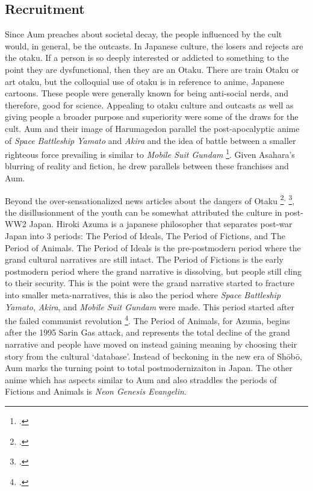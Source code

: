 \documentclass[12pt, letterpaper]{article}
\newcommand{\sorta}[1]{`#1'}
\newcommand{\poses}[1]{#1's}
\begin{document}
\subsection{Recruitment}
Since Aum preaches about societal decay, the people influenced by the cult would, in general, be the 
outcasts. In Japanese culture, the losers and rejects are the otaku. If a person is so deeply interested or
addicted to something to the point they are dysfunctional, then they are an Otaku. There are train Otaku or
art otaku, but the colloquial use of otaku is in reference to anime, Japanese cartoons. These people were
generally known for being anti-social nerds, and therefore, good for science. Appealing to otaku culture and
outcasts as well as giving people a broader purpose and superiority were some of the draws for the cult. Aum
and their image of Harumagedon parallel the post-apocalyptic anime of \textit{Space Battleship Yamato} and
\textit{Akira} and the idea of battle between a smaller righteous force prevailing is similar to
\textit{Mobile Suit Gundam} \footcite{macwilliams_japanese_2008}. Given \poses{Asahara} blurring of reality and fiction, he drew parallels between these franchises and Aum. 

Beyond the over-sensationalized news articles about the dangers of Otaku 
\footcite{noauthor_mike_nodate}\textsuperscript{,}
\footcite{noauthor_cult_nodate}, the disillusionment of the youth can be somewhat attributed the culture in
post-WW2 Japan. Hiroki Azuma is a japanese philosopher that separates post-war Japan into 3 periods: The
Period of Ideals, The Period of Fictions, and The Period of Animals. The Period of Ideals is the
pre-postmodern 
period where the grand cultural narratives are still intact. The Period of Fictions is the early postmodern
period where the grand narrative is dissolving, but people still cling to their security. This is the point
were the grand narrative started to fracture into smaller meta-narratives, this is also the period where
\textit{Space Battleship Yamato}, \textit{Akira}, and \textit{Mobile Suit Gundam} were made. This period
started after the failed communist revolution \footcite[12]{kane_repackaging_2016}. The Period of Animals,
for
Azuma, begins after the 1995 Sarin Gas attack, and represents the total decline of the grand narrative and
people have moved on instead gaining meaning by choosing their story from the cultural \sorta{database}.
Instead of beckoning in the new era of Sh\=ob\=o, Aum marks the turning point to total postmodernizaiton in
Japan. The other anime which has aspects similar to Aum and also straddles the periods of Fictions and
Animals is \textit{Neon Genesis Evangelin}. 
\end{document}
